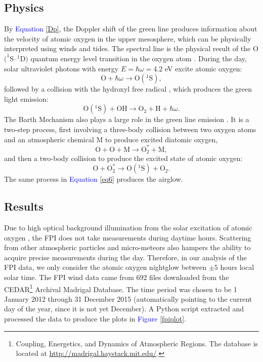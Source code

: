 \documentclass[11pt]{article}
\begin{document}
\subsection{Physics}
By \textcolor{blue}{Equation} \ref{Dp}, the Doppler shift of the green line produces information about the velocity of atomic oxygen in the upper mesosphere, which can be physically interpreted using winds and tides. The spectral line is the physical result of the $\text{O}$$(^1\text{S}$--$^1\text{D})$ quantum energy level transition in the oxygen atom \cite{Gao2012}. During the day, solar ultraviolet photons with energy $E = \hbar\omega = 4.2$ eV excite atomic oxygen:
	\begin{equation}
		\text{O} + \hbar\omega\rightarrow\text{O}(^1\text{S}),
	\end{equation}
followed by a collision with the hydroxyl free radical \cite{glow}, which produces the green light emission:
	\begin{equation}\label{eq6}
		\text{O}(^1\text{S}) + \text{OH} \rightarrow \text{O}_2 + \text{H} + \hbar\omega.
	\end{equation}
The Barth Mechanism also plays a large role in the green line emission \cite{Gao2012}. It is a two-step process, first involving a three-body collision between two oxygen atoms and an atmospheric chemical $\text{M}$ to produce excited diatomic oxygen,
	\begin{equation}
		\text{O} + \text{O} + \text{M} \rightarrow \text{O}_2^* + \text{M},
	\end{equation}
and then a two-body collision to produce the excited state of atomic oxygen:
	\begin{equation}
		\text{O} + \text{O}_2^* \rightarrow \text{O}(^1\text{S}) + \text{O}_2.
	\end{equation}
The same process in \textcolor{blue}{Equation} \ref{eq6} produces the airglow.
\subsection{Results}

Due to high optical background illumination from the solar excitation of atomic oxygen \cite{Hedin2009}, the FPI does not take measurements during daytime hours. Scattering from other atmospheric particles and micro-meteors also hampers the ability to acquire precise measurements during the day. Therefore, in our analysis of the FPI data, we only consider the atomic oxygen nightglow between $\pm 5$ hours local solar time. The FPI wind data came from 692 files downloaded from the CEDAR\footnote{Coupling, Energetics, and Dynamics of Atmospheric Regions. The database is located at \url{http://madrigal.haystack.mit.edu/}.} Archival Madrigal Database. The time period was chosen to be 1 January 2012 through 31 December 2015 (automatically pointing to the current day of the year, since it is not yet December). A Python script extracted and processed the data to produce the plots in \textcolor{blue}{Figure} \ref{fpiplot}.
\end{document}
